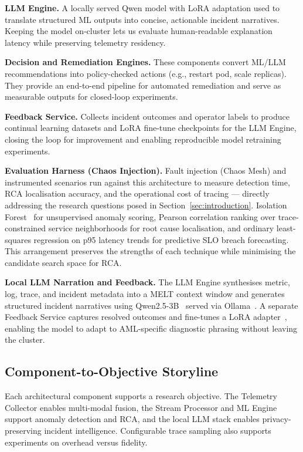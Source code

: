 \documentclass[a4paper]{lipics-v2021}
\newcommand{\mypara}[1]{{\vspace{0.1mm}\noindent\textbf{#1}}}
\begin{document}
\mypara{LLM Engine.} A locally served Qwen model with LoRA adaptation used to
translate structured ML outputs into concise, actionable incident narratives.
Keeping the model on-cluster lets us evaluate human-readable explanation
latency while preserving telemetry residency.

\mypara{Decision and Remediation Engines.} These components convert ML/LLM
recommendations into policy-checked actions (e.g., restart pod, scale
replicas). They provide an end-to-end pipeline for automated remediation and
serve as measurable outputs for closed-loop experiments.

\mypara{Feedback Service.} Collects incident outcomes and operator labels to
produce continual learning datasets and LoRA fine-tune checkpoints for the
LLM Engine, closing the loop for improvement and enabling reproducible model
retraining experiments.

\mypara{Evaluation Harness (Chaos Injection).} Fault injection (Chaos Mesh) and
instrumented scenarios run against this architecture to measure detection time,
RCA localisation accuracy, and the operational cost of tracing — directly
addressing the research questions posed in Section~\ref{sec:introduction}.
Isolation Forest~\cite{liu2012isolation} for unsupervised anomaly scoring,
Pearson correlation ranking over trace-constrained service neighborhoods for root
cause localisation, and ordinary least-squares regression on p95 latency trends for
predictive SLO breach forecasting. This arrangement preserves the strengths of each
technique while minimising the candidate search space for RCA.

\mypara{Local LLM Narration and Feedback.}
The LLM Engine synthesises metric, log, trace, and incident metadata into a MELT
context window and generates structured incident narratives using Qwen2.5-3B~\cite{qwen2024}
served via Ollama~\cite{ollama2023}. A separate Feedback Service captures resolved
outcomes and fine-tunes a LoRA adapter~\cite{hu2022lora}, enabling the model to
adapt to AML-specific diagnostic phrasing without leaving the cluster.

\subsection{Component-to-Objective Storyline}

Each architectural component supports a research objective. The Telemetry
Collector enables multi-modal fusion, the Stream Processor and ML Engine support
anomaly detection and RCA, and the local LLM stack enables privacy-preserving
incident intelligence. Configurable trace sampling also supports experiments on
overhead versus fidelity.
\end{document}
